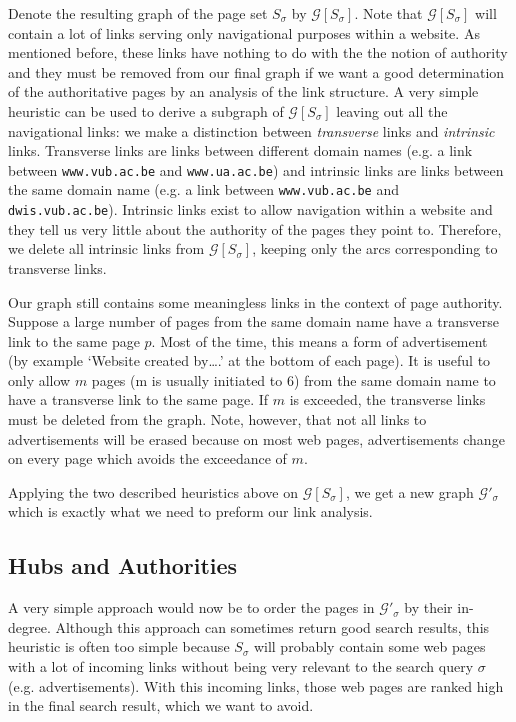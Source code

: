 \documentclass[a4paper,11pt]{report}
\newcommand{\graf}{\mathscr{G}}
\begin{document}
Denote the resulting graph of the page set $S_\sigma$ by $\graf[S_\sigma]$. Note that $\graf[S_\sigma]$ will 
contain 
a lot of links serving only navigational purposes within a website. As mentioned 
before, these links have nothing to do with the the notion of authority and they must be 
removed from our final graph if we want a good determination of  the authoritative pages by an analysis of
 the link structure.  A very simple heuristic can be used to derive a subgraph 
 of $\graf[S_\sigma]$ leaving out all the navigational links: we make a 
 distinction between \emph{transverse} links and \emph{intrinsic} links. 
 Transverse links are links between different domain names (e.g. a link between \texttt{www.vub.ac.be} and
 \texttt{www.ua.ac.be}) and intrinsic links are links between the same domain 
 name (e.g. a link between \texttt{www.vub.ac.be} and
 \texttt{dwis.vub.ac.be}). Intrinsic links exist to allow navigation within a 
 website and they tell us very little about the authority of the pages they 
 point to. Therefore, we delete all intrinsic links from  $\graf[S_\sigma]$, 
 keeping only the arcs corresponding to transverse links.
 
Our graph still contains some meaningless links in the context of page 
 authority. Suppose a large number of pages from the same domain name have a transverse link to 
 the same page $p$. Most of the time, this means a form of advertisement (by example `Website created by\ldots.' at the bottom of each page). It is useful 
 to only allow $m$ pages (m is usually initiated to 6) from the same domain name to have a transverse link to the same page. 
 If $m$ is exceeded, the transverse links must be deleted from the graph. Note, 
 however, that not all links to advertisements will be erased because on most 
 web pages, advertisements change on every page which avoids the exceedance of $m$.
 
 Applying the two described heuristics above on $\graf[S_\sigma]$, we get a new 
 graph $\graf'_\sigma$ which is exactly what we need to preform our link analysis.
 
 \subsection{Hubs and Authorities}
 A very simple approach would now be to order the pages in $\graf'_\sigma$ by 
 their in-degree. Although this approach can sometimes return good search results, this
 heuristic is often too simple because $S_\sigma$ will probably contain some 
 web pages with a lot of incoming links without being very relevant to the search query $\sigma$ (e.g. advertisements).   
 With this incoming links, those web pages are ranked high in the final search 
 result, which we want to avoid.
\end{document}

